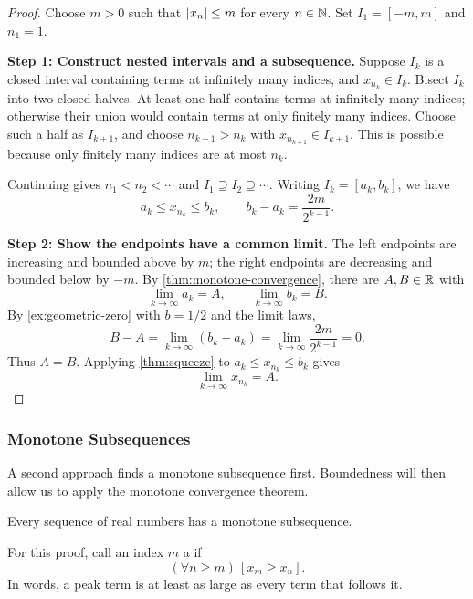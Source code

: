 \begin{proof}
    Choose $m>0$ such that $\left|x_n\right|\leq m$ for every $n\in\mathbb{N}$.
    Set $I_1=[-m,m]$ and $n_1=1$.

    \textbf{Step 1: Construct nested intervals and a subsequence.}
    Suppose $I_k$ is a closed interval containing terms at infinitely many
    indices, and $x_{n_k}\in I_k$. Bisect $I_k$ into two closed halves.
    At least one half contains terms at infinitely many indices;
    otherwise their union would contain terms at only finitely many
    indices. Choose such a half as $I_{k+1}$, and choose $n_{k+1}>n_k$
    with $x_{n_{k+1}}\in I_{k+1}$. This is possible because only finitely
    many indices are at most $n_k$.

    Continuing gives $n_1<n_2<\cdots$ and
    $I_1\supseteq I_2\supseteq\cdots$. Writing $I_k=[a_k,b_k]$, we have
    \[
        a_k\leq x_{n_k}\leq b_k,
        \qquad b_k-a_k=\frac{2m}{2^{k-1}}.
    \]

    \textbf{Step 2: Show the endpoints have a common limit.}
    The left endpoints are increasing and bounded above by $m$;
    the right endpoints are decreasing and bounded below by $-m$.
    By \cref{thm:monotone-convergence}, there are $A,B\in\mathbb{R}$ with
    \[
        \lim_{k\to\infty}a_k=A,
        \qquad \lim_{k\to\infty}b_k=B.
    \]
    By \cref{ex:geometric-zero} with $b=1/2$ and the limit laws,
    \[
        B-A=\lim_{k\to\infty}(b_k-a_k)
            =\lim_{k\to\infty}\frac{2m}{2^{k-1}}=0.
    \]
    Thus $A=B$. Applying \cref{thm:squeeze} to
    $a_k\leq x_{n_k}\leq b_k$ gives
    \[
        \lim_{k\to\infty}x_{n_k}=A.
    \]
\end{proof}

\subsubsection{Monotone Subsequences}
A second approach finds a monotone subsequence first. Boundedness will
then allow us to apply the monotone convergence theorem.

\begin{theorem}\label{thm:monotone-subsequence}
    Every sequence of real numbers has a monotone subsequence.
\end{theorem}
For this proof, call an index $m$ a  if
\[
    (\forall n\geq m)\,[x_m\geq x_n].
\]
In words, a peak term is at least as large as every term that follows it.

